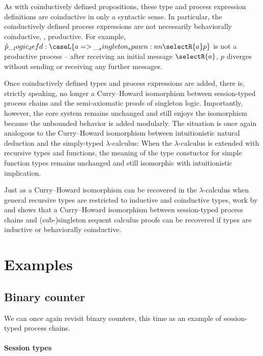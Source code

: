 As with coinductively defined propositions, these type and process expression definitions are coinductive in only a syntactic sense.
In particular, the coinductively defined process expressions are not necessarily behaviorally coinductive, \ie, productive.
For example, $\defp{p} \defd \caseL{a => \spawn{\selectR{a}}{p}}$ is not a productive process -- after receiving an initial message $\selectR{a}$, $p$ diverges without sending or receiving any further messages.

Once coinductively defined types and process expressions are added, there is, strictly speaking, no longer a Curry--Howard isomorphism between session-typed process chains and the semi-axiomatic proofs of singleton logic.
Importantly, however, the core system remains unchanged and still enjoys the isomorphism because the unbounded behavior is added modularly.
The situation is once again analogous to the Curry--Howard isomorphism between intuitionistic natural deduction and the simply-typed $\lambda$-calculus:
When the $\lambda$-calculus is extended with recursive types and functions, the meaning of the type constuctor for simple function types remains unchanged and still isomorphic with intuitionistic implication.

Just as a Curry--Howard isomorphism can be recovered in the $\lambda$-calculus when general recursive types are restricted to inductive and coinductive types, work by \textcite{Derakhshan+Pfenning:??} and \textcite{Somayyajula+Pfenning:??} shows that a Curry--Howard isomorphism between session-typed process chains and (sub-)singleton sequent calculus proofs can be recovered if types are inductive or behaviorally coinductive.


\section{Examples}

\subsection{Binary counter}

We can once again revisit binary counters, this time as an example of session-typed process chains.

\paragraph*{Session types}

